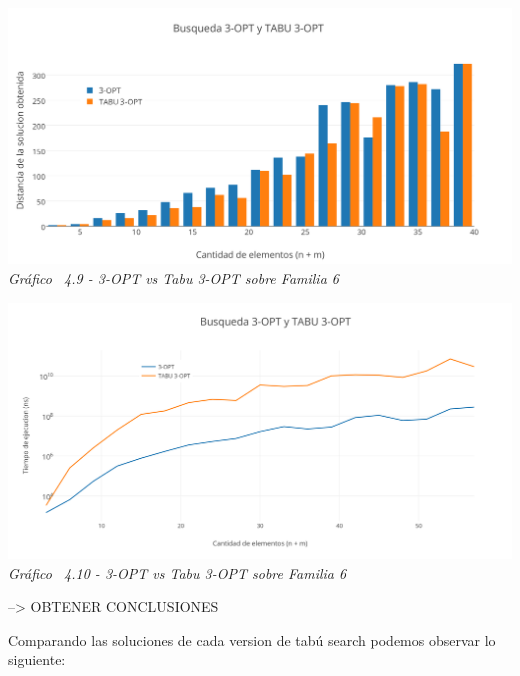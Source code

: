 \vspace*{0.3cm} \vspace*{0.3cm}
  \begin{center}
 \includegraphics[scale=0.5]{./EJ4/comparativogym03opt.png}\\
 {            \textit{Gráfico \ 4.9 - 3-OPT vs Tabu 3-OPT sobre Familia 6}}
  \end{center}
  \vspace*{0.3cm}

\vspace*{0.3cm} \vspace*{0.3cm}
  \begin{center}
 \includegraphics[scale=0.5]{./EJ4/medicion3optsinorden.png}\\
 {            \textit{Gráfico \ 4.10 - 3-OPT vs Tabu 3-OPT sobre Familia 6}}
  \end{center}
  \vspace*{0.3cm}
  
--> OBTENER CONCLUSIONES
  
Comparando las soluciones de cada version de tabú search podemos observar lo siguiente:

